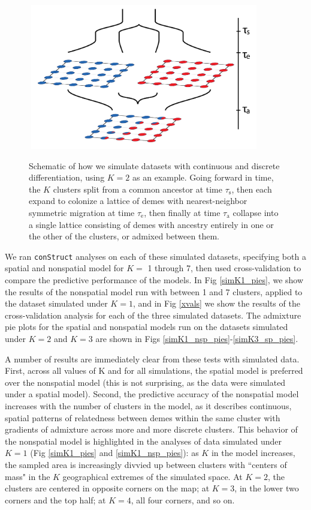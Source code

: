 \documentclass[12pt]{article}
\begin{document}
\begin{figure}
	\centering
		{\includegraphics[width=4in,height=2.5in]{figs/sims/sim_setup.png}}
		\caption{Schematic of how we simulate datasets with continuous and discrete differentiation, using $K=2$ as an example.  
			    Going forward in time, the $K$ clusters split from a common ancestor at time $\tau_{\text{s}}$,
			    then each expand to colonize a lattice of demes with nearest-neighbor symmetric migration at time $\tau_{\text{e}}$,
			    then finally at time $\tau_{\text{a}}$ collapse into a single lattice consisting of demes 
			    with ancestry entirely in one or the other of the clusters,
			    or admixed between them.
			    }\label{sim_setup}
\end{figure}

We ran \texttt{conStruct} analyses on each of these simulated datasets, 
specifying both a spatial and nonspatial model for $K = $ 1 through 7, 
then used cross-validation to compare the predictive performance of the models.
In Fig \ref{simK1_pies}, we show the results of the nonspatial model 
run with between 1 and 7 clusters, applied to the dataset simulated under $K=1$,
and in Fig \ref{xvals} we show the results of the cross-validation analysis for each of the three simulated datasets.
The admixture pie plots for the spatial and nonspatial models run on the datasets simulated under $K=2$ and $K=3$
are shown in Figs \ref{simK1_nsp_pies}-\ref{simK3_sp_pies}.

A number of results are immediately clear from these tests with simulated data.
First, across all values of K and for all simulations, 
the spatial model is preferred over the nonspatial model
(this is not surprising, as the data were simulated under a spatial model).
Second, the predictive accuracy of the nonspatial model increases with the number of clusters in the model, 
as it describes continuous, spatial patterns of relatedness between demes within the same cluster 
with gradients of admixture across more and more discrete clusters.
This behavior of the nonspatial model is highlighted in the analyses of data simulated under $K=1$ (Fig \ref{simK1_pies} and \ref{simK1_nsp_pies}):
as $K$ in the model increases, 
the sampled area is increasingly divvied up between clusters 
with ``centers of mass" in the $K$ geographical extremes of the simulated space.
At $K=2$, the clusters are centered in opposite corners on the map; 
at $K=3$, in the lower two corners and the top half; 
at $K=4$, all four corners, and so on.
\end{document}

